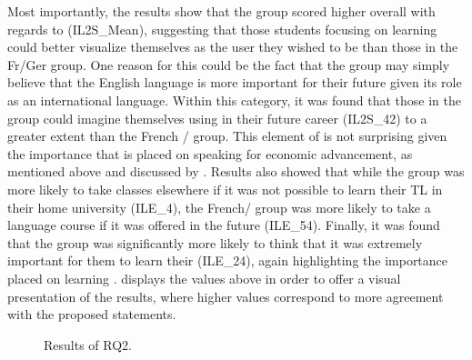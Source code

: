 \documentclass[output=paper]{langsci/langscibook}
\begin{document}
Most importantly, the results show that the  group scored higher overall with regards to  (IL2S\_Mean), suggesting that those students focusing on learning  could better visualize themselves as the  user they wished to be than those in the Fr/Ger group. One reason for this could be the fact that the  group may simply believe that the English language is more important for their future given its role as an international language. Within this category, it was found that those in the  group could imagine themselves using  in their future career (IL2S\_42) to a greater extent than the French / group. This element of  is not surprising given the importance that is placed on speaking  for economic advancement, as mentioned above and discussed by \citet{BlockCameron2002}. Results also showed that while the  group was more likely to take classes elsewhere if it was not possible to learn their TL in their home university (ILE\_4), the French/ group was more likely to take a language course if it was offered in the future (ILE\_54). Finally, it was found that the  group was significantly more likely to think that it was extremely important for them to learn their  (ILE\_24), again highlighting the importance placed on learning .  displays the values above in order to offer a visual presentation of the results, where higher values correspond to more agreement with the proposed statements.

\begin{figure}  

\caption{{Results of RQ2.}}
\label{fig:geoghegan:graph3}
\end{figure}
\end{document}
